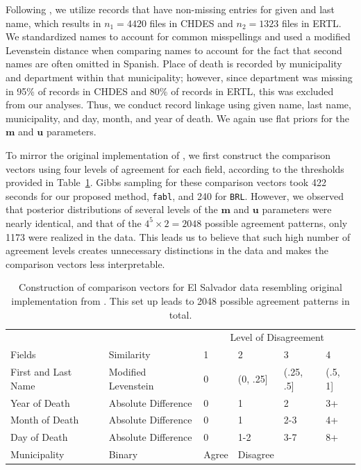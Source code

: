 \documentclass[12pt,letterpaper]{article}
\newcommand{\1}[1]{\mathbb{I}\!\left[#1\right]} %
\begin{document}
Following \cite{sadinle_bayesian_2017}, we utilize records that have non-missing entries for given and last name, which results in \(n_1 = 4420\) files in CHDES and \(n_2 = 1323\) files in ERTL. We standardized names to account for common misspellings and used a modified Levenstein distance when comparing names to account for the fact that second names are often omitted in Spanish. Place of death is recorded by municipality and department within that municipality; however, since department was missing in 95\% of records in CHDES and 80\% of records in ERTL, this was excluded from our analyses. Thus, we conduct record linkage using given name, last name, municipality, and day, month, and year of death. We again use flat priors for the \(\bm{m}\) and \(\bm{u}\) parameters.

To mirror the original implementation of \cite{sadinle_bayesian_2017}, we first construct the comparison vectors using four levels of agreement for each field, according to the thresholds provided in Table~\ref{Tab:el_salvador_cutoffs_1}. Gibbs sampling for these comparison vectors took 422 seconds for our proposed method, \texttt{fabl}, and 240 for \texttt{BRL}. However, we observed that posterior distributions of several levels of the \(\bm{m}\) and \(\bm{u}\) parameters were nearly identical, and that of the \(4^5 \times 2 = 2048\) possible agreement patterns, only 1173 were realized in the data. This leads us to believe that such high number of agreement levels creates unnecessary distinctions in the data and makes the comparison vectors less interpretable. 

\begin{table}
	\begin{tabular}[h!]{ll|llll}
		\hline
		\multicolumn{2}{c|}{ } & \multicolumn{4}{c}{Level of Disagreement} \\
		\cline{3-6}
		Fields & Similarity & 1 & 2 & 3 & 4\\
		\hline
		First and Last Name & Modified Levenstein & 0 & (0, .25] & (.25, .5] & (.5, 1]\\
		Year of Death & Absolute Difference & 0 & 1 & 2 & 3+\\
		Month of Death & Absolute Difference & 0 & 1 & 2-3 & 4+\\
		Day of Death & Absolute Difference & 0 & 1-2 & 3-7 & 8+\\
		Municipality & Binary & Agree & Disagree &  & \\
		\hline
	\end{tabular}
	\caption{Construction of comparison vectors for El Salvador data resembling original implementation from \citep{sadinle2018bayesian}. This set up leads to 2048 possible agreement patterns in total.}\label{Tab:el_salvador_cutoffs_1}
\end{table}
\end{document}
